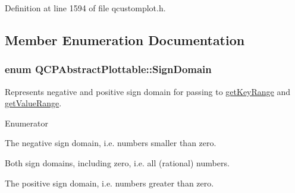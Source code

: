 

Definition at line 1594 of file qcustomplot.\+h.



\subsection{Member Enumeration Documentation}
\hypertarget{class_q_c_p_abstract_plottable_a661743478a1d3c09d28ec2711d7653d8}{}
\subsubsection[{Sign\+Domain}]{\setlength{\rightskip}{0pt plus 5cm}enum {\bf Q\+C\+P\+Abstract\+Plottable\+::\+Sign\+Domain}\hspace{0.3cm}{\ttfamily [protected]}}\label{class_q_c_p_abstract_plottable_a661743478a1d3c09d28ec2711d7653d8}
Represents negative and positive sign domain for passing to \hyperlink{class_q_c_p_abstract_plottable_a345d702b2e7e12c8cfdddff65ba85e8c}{get\+Key\+Range} and \hyperlink{class_q_c_p_abstract_plottable_aa3331b415b5939fe4df60b78831b2799}{get\+Value\+Range}. \begin{Desc}
\item[Enumerator]\par
\begin{description}
\item[{\em 
\hypertarget{class_q_c_p_abstract_plottable_a661743478a1d3c09d28ec2711d7653d8a0fc9a70796ef60ad18ddd18056e6dc63}{}sd\+Negative\label{class_q_c_p_abstract_plottable_a661743478a1d3c09d28ec2711d7653d8a0fc9a70796ef60ad18ddd18056e6dc63}
}]The negative sign domain, i.\+e. numbers smaller than zero. \item[{\em 
\hypertarget{class_q_c_p_abstract_plottable_a661743478a1d3c09d28ec2711d7653d8a082b98cfb91a7363a3b5cd17b0c1cd60}{}sd\+Both\label{class_q_c_p_abstract_plottable_a661743478a1d3c09d28ec2711d7653d8a082b98cfb91a7363a3b5cd17b0c1cd60}
}]Both sign domains, including zero, i.\+e. all (rational) numbers. \item[{\em 
\hypertarget{class_q_c_p_abstract_plottable_a661743478a1d3c09d28ec2711d7653d8a02951859f243a4d24e779cfbb5471030}{}sd\+Positive\label{class_q_c_p_abstract_plottable_a661743478a1d3c09d28ec2711d7653d8a02951859f243a4d24e779cfbb5471030}
}]The positive sign domain, i.\+e. numbers greater than zero. \end{description}
\end{Desc}


